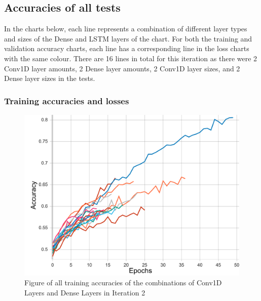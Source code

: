 \subsection{Accuracies of all tests}
In the charts below, each line represents a combination of different layer types and sizes of the Dense and LSTM layers of the chart.
For both the training and validation accuracy charts, each line has a corresponding line in the loss charts with the same colour.
There are 16 lines in total for this iteration as there were 2 Conv1D layer amounts, 2 Dense layer amounts,
2 Conv1D layer sizes, and 2 Dense layer sizes in the tests.

\subsubsection{Training accuracies and losses}
\begin{figure}[ht]
    \centering
    \includegraphics[width=0.95\columnwidth]{figures/results/cnn/cnn_all_acc_t.pdf}
    \caption[Training accuracies for Iteration 2]{Figure of all training accuracies of the combinations of Conv1D Layers and Dense Layers in Iteration 2}
    \label{fig:iteration2_train_accuracy}
\end{figure}
\FloatBarrier

